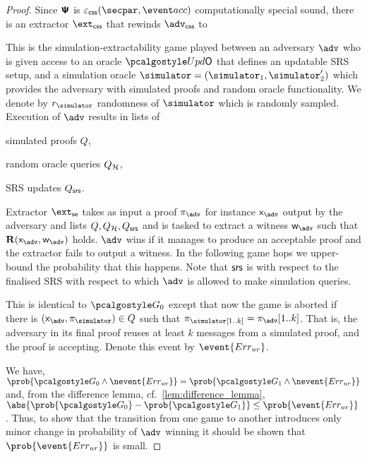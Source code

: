 \begin{proof}
	Since $\bm{\mathsf{\Psi}}$ is $\epscss (\secpar, \accProb)$ computationally special sound, there is an extractor $\extcss$ that rewinds $\advcss$ to 

		


	 This is the simulation-extractability game played between an adversary
	$\advse$ who is given access to an oracle $\initU$ that defines an updatable SRS
	setup, and a simulation oracle $\simulator = (\simulator_1, \simulator_2')$ which provides the adversary with simulated
	proofs and random oracle functionality. We denote by $\rsim$
	randomness of $\simulator$ which is randomly sampled. Execution of $\advse$ results in
	lists of
	\begin{inparaenum}[(1)]
		\item simulated proofs $Q$,
		\item random oracle queries $Q_{\mathcal{H}}$,
		\item SRS updates $Q_{\mathsf{srs}}$.
	\end{inparaenum}
	Extractor $\extse$ takes as input a proof $\zkproof_{\advse}$ for instance
	$\inp_{\advse}$ output by the adversary and lists $Q, Q_{\mathcal{H}}, Q_{\mathsf{srs}}$ and is tasked
	to extract a witness $\wit_{\advse}$ such that $\REL(\inp_{\advse}, \wit_{\advse})$
	holds. $\advse$ wins if it manages to produce an acceptable proof and the extractor
	fails to output a witness. In the following game hops we upper-bound the
	probability that this happens. Note that $\mathsf{srs}$ is with respect to the finalised
	SRS with respect to which $\adv$ is allowed to make simulation queries.
	
	 This is identical to $\game{0}$ except that now the game is aborted if
	there is $(\inp_\advse, \zkproof_{\simulator}) \in Q$ such that
	$\zkproof_\simulator[1..k] = \zkproof_{\advse}[1..k]$. That is, the adversary in
	its final proof reuses at least $k$ messages from a simulated proof, and the proof
	is accepting.  Denote this event by $\event{\errur}$.

	 We have,
	\( \prob{\game{0} \land \nevent{\errur}} = \prob{\game{1} \land \nevent{\errur}} \)
	and, from the difference lemma, cf.~\cref{lem:difference_lemma},
	$ \abs{\prob{\game{0}} - \prob{\game{1}}} \leq \prob{\event{\errur}}\,$.  Thus, to
	show that the transition from one game to another introduces only minor change in
	probability of $\adv$ winning it should be shown that $\prob{\event{\errur}}$ is
	small.
	

\end{proof}

